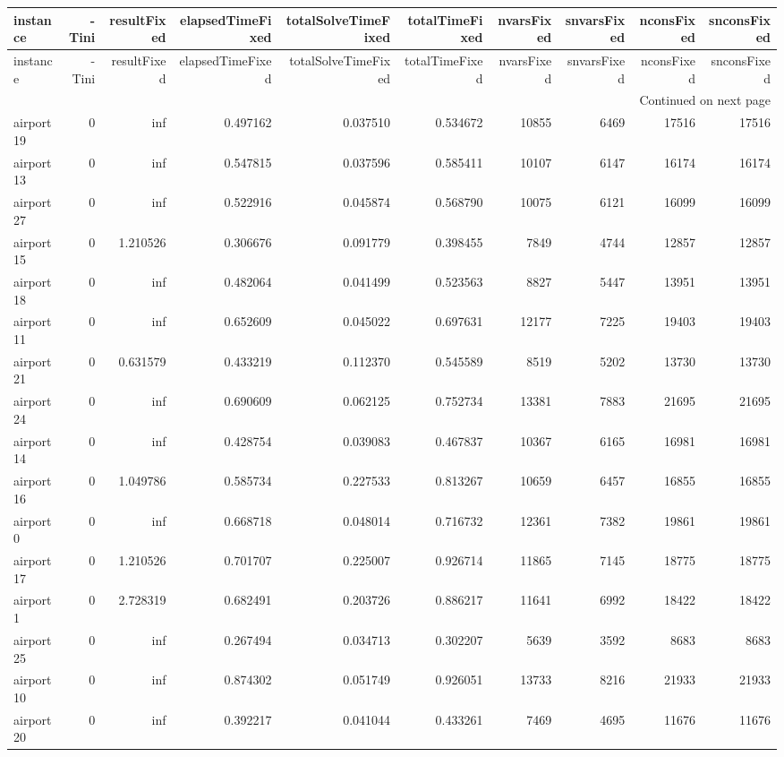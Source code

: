 \begin{longtable}{|l|r|r|r|r|r|r|r|r|r|}
\toprule
instance & -Tini & resultFixed & elapsedTimeFixed & totalSolveTimeFixed & totalTimeFixed & nvarsFixed & snvarsFixed & nconsFixed & snconsFixed \\
\midrule
\endfirsthead
\toprule
instance & -Tini & resultFixed & elapsedTimeFixed & totalSolveTimeFixed & totalTimeFixed & nvarsFixed & snvarsFixed & nconsFixed & snconsFixed \\
\midrule
\endhead
\midrule
\multicolumn{10}{r}{Continued on next page} \\
\midrule
\endfoot
\bottomrule
\endlastfoot
airport19 & 0 & inf & 0.497162 & 0.037510 & 0.534672 & 10855 & 6469 & 17516 & 17516 \\
airport13 & 0 & inf & 0.547815 & 0.037596 & 0.585411 & 10107 & 6147 & 16174 & 16174 \\
airport27 & 0 & inf & 0.522916 & 0.045874 & 0.568790 & 10075 & 6121 & 16099 & 16099 \\
airport15 & 0 & 1.210526 & 0.306676 & 0.091779 & 0.398455 & 7849 & 4744 & 12857 & 12857 \\
airport18 & 0 & inf & 0.482064 & 0.041499 & 0.523563 & 8827 & 5447 & 13951 & 13951 \\
airport11 & 0 & inf & 0.652609 & 0.045022 & 0.697631 & 12177 & 7225 & 19403 & 19403 \\
airport21 & 0 & 0.631579 & 0.433219 & 0.112370 & 0.545589 & 8519 & 5202 & 13730 & 13730 \\
airport24 & 0 & inf & 0.690609 & 0.062125 & 0.752734 & 13381 & 7883 & 21695 & 21695 \\
airport14 & 0 & inf & 0.428754 & 0.039083 & 0.467837 & 10367 & 6165 & 16981 & 16981 \\
airport16 & 0 & 1.049786 & 0.585734 & 0.227533 & 0.813267 & 10659 & 6457 & 16855 & 16855 \\
airport0 & 0 & inf & 0.668718 & 0.048014 & 0.716732 & 12361 & 7382 & 19861 & 19861 \\
airport17 & 0 & 1.210526 & 0.701707 & 0.225007 & 0.926714 & 11865 & 7145 & 18775 & 18775 \\
airport1 & 0 & 2.728319 & 0.682491 & 0.203726 & 0.886217 & 11641 & 6992 & 18422 & 18422 \\
airport25 & 0 & inf & 0.267494 & 0.034713 & 0.302207 & 5639 & 3592 & 8683 & 8683 \\
airport10 & 0 & inf & 0.874302 & 0.051749 & 0.926051 & 13733 & 8216 & 21933 & 21933 \\
airport20 & 0 & inf & 0.392217 & 0.041044 & 0.433261 & 7469 & 4695 & 11676 & 11676 \\

\end{longtable}
